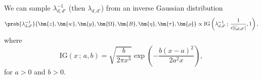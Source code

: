 We can sample $\lambda_{d,d'}^{-1}$ (then $\lambda_{d,d'}$) from an inverse Gaussian distribution
\begin{equation}\label{eq:lambda_sampling}
\prob {\lambda_{d,d'}^{-1}} {\bm{z}, \bm{w}, \bm{y}, \bm{\Omega}, \bm{B}, \bm{\eta}, \bm{\tau}, \bm{\rho}} \propto \mathrm{IG} \left( \lambda_{d,d'}^{-1} \,;\, \frac{1}{c|\zeta_{d,d'}|}, 1 \right),
\end{equation}
where
\begin{equation}
\mathrm{IG} (x \,;\, a, b) = \sqrt{\frac{b}{2\pi x^3}} \exp \left( -\frac {b (x-a)^2} {2a^2 x} \right),
\end{equation}
for $a>0$ and $b>0$. 